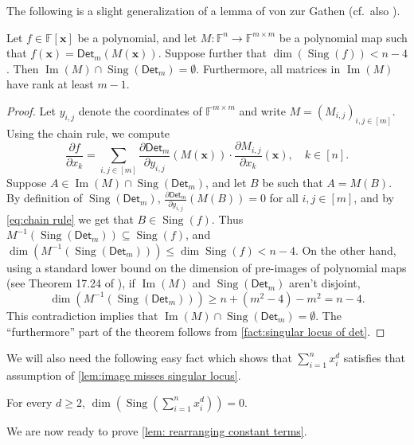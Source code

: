 \documentclass[10pt,a4paper]{article}
\newcommand{\F}{\mathbb{F}}
\newcommand{\vx}{\mathbf{x}}
\newcommand{\Det}{\mathsf{Det}}
\DeclareMathOperator{\Sing}{Sing}
\DeclareMathOperator{\Img}{Im}
\begin{document}
The following is a slight generalization of a lemma of von zur Gathen (cf.\ also \cite{ABV17}).

\begin{lemma}\label{lem:image misses singular locus}
Let $f \in \F[\vx]$ be a polynomial, and let $M : \F^n \to \F^{m \times m}$ be a polynomial map such that $f(\vx) = \Det_m(M(\vx))$. Suppose further that $\dim(\Sing(f)) < n-4$. Then $\Img(M) \cap \Sing(\Det_m) = \emptyset$. Furthermore, all matrices in $\Img(M)$ have rank at least $m-1$.
\end{lemma}

\begin{proof}
Let $y_{i,j}$ denote the coordinates of $\F^{m \times m}$ and write $M = (M_{i,j})_{i ,j \in [m]}$. Using the chain rule, we compute
\begin{equation}\label{eq:chain rule}
\frac{\partial f}{\partial x_k} = \sum_{i, j \in [m]} \frac{\partial \Det_m}{\partial y_{i,j}} (M(\vx)) \cdot \frac{\partial M_{i,j}}{\partial x_k} (\vx), \quad k \in [n].
\end{equation}
Suppose $A \in \Img(M) \cap \Sing(\Det_m)$, and let $B$ be such that $A = M(B)$. By definition of $\Sing(\Det_m)$, $\frac{\partial \Det_m}{\partial y_{i,j}} (M(B)) = 0$ for all $i, j \in [m]$, and  by \eqref{eq:chain rule} we get that $B \in \Sing (f)$. Thus $M^{-1} (\Sing(\Det_m)) \subseteq \Sing(f)$, and $\dim (M^{-1} (\Sing(\Det_m))) \le  \dim \Sing(f) < n-4$. On the other hand, using a standard lower bound on the dimension of pre-images of polynomial maps (see Theorem 17.24 of \cite{HarrisAlgebraicGeometry}), if $\Img(M)$ and $\Sing(\Det_m)$ aren't disjoint,
\[
\dim(M^{-1} (\Sing(\Det_m))) \ge n + (m^2 - 4) - m^2 = n-4.
\]
This contradiction implies that $\Img(M) \cap \Sing(\Det_m) = \emptyset$. The ``furthermore'' part of the theorem follows from \autoref{fact:singular locus of det}.
\end{proof}

We will also need the following easy fact which shows that $\sum_{i=1}^n x_i ^d$ satisfies that assumption of \autoref{lem:image misses singular locus}.

\begin{fact}\label{fact:sing locus of power-sym}
For every $d \ge 2$, $\dim(\Sing(\sum_{i=1}^n x_i^d)) = 0$.
\end{fact}


We are now ready to prove \autoref{lem: rearranging constant terms}.
\end{document}
